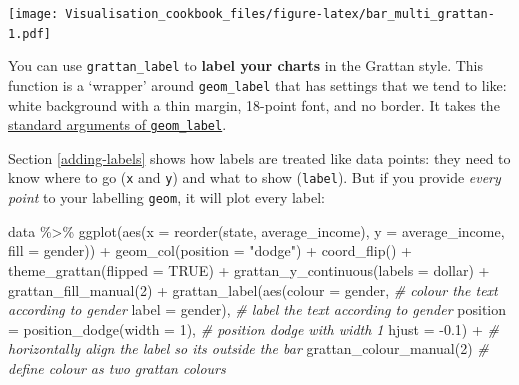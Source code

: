 \documentclass[
]{book}
\newenvironment{Shaded}{\begin{snugshade}}{\end{snugshade}}
\newcommand{\AttributeTok}[1]{\textcolor[rgb]{0.77,0.63,0.00}{#1}}
\newcommand{\CommentTok}[1]{\textcolor[rgb]{0.56,0.35,0.01}{\textit{#1}}}
\newcommand{\ConstantTok}[1]{\textcolor[rgb]{0.00,0.00,0.00}{#1}}
\newcommand{\DecValTok}[1]{\textcolor[rgb]{0.00,0.00,0.81}{#1}}
\newcommand{\FloatTok}[1]{\textcolor[rgb]{0.00,0.00,0.81}{#1}}
\newcommand{\FunctionTok}[1]{\textcolor[rgb]{0.00,0.00,0.00}{#1}}
\newcommand{\NormalTok}[1]{#1}
\newcommand{\SpecialCharTok}[1]{\textcolor[rgb]{0.00,0.00,0.00}{#1}}
\newcommand{\StringTok}[1]{\textcolor[rgb]{0.31,0.60,0.02}{#1}}
\begin{document}
\texttt{[image: Visualisation\_cookbook\_files/figure-latex/bar\_multi\_grattan-1.pdf]}

You can use \texttt{grattan\_label} to \textbf{label your charts} in the Grattan style. This function is a `wrapper' around \texttt{geom\_label} that has settings that we tend to like: white background with a thin margin, 18-point font, and no border. It takes the \href{https://ggplot2.tidyverse.org/reference/geom_text.html}{standard arguments of \texttt{geom\_label}}.

Section \ref{adding-labels} shows how labels are treated like data points: they need to know where to go (\texttt{x} and \texttt{y}) and what to show (\texttt{label}). But if you provide \emph{every point} to your labelling \texttt{geom}, it will plot every label:

\begin{Shaded}
\begin{Highlighting}[]
\NormalTok{data }\SpecialCharTok{\%\textgreater{}\%} 
  \FunctionTok{ggplot}\NormalTok{(}\FunctionTok{aes}\NormalTok{(}\AttributeTok{x =} \FunctionTok{reorder}\NormalTok{(state, average\_income), }
             \AttributeTok{y =}\NormalTok{ average\_income,}
             \AttributeTok{fill =}\NormalTok{ gender)) }\SpecialCharTok{+} 
  \FunctionTok{geom\_col}\NormalTok{(}\AttributeTok{position =} \StringTok{"dodge"}\NormalTok{) }\SpecialCharTok{+} 
  \FunctionTok{coord\_flip}\NormalTok{() }\SpecialCharTok{+} 
  \FunctionTok{theme\_grattan}\NormalTok{(}\AttributeTok{flipped =} \ConstantTok{TRUE}\NormalTok{) }\SpecialCharTok{+} 
  \FunctionTok{grattan\_y\_continuous}\NormalTok{(}\AttributeTok{labels =}\NormalTok{ dollar) }\SpecialCharTok{+} 
  \FunctionTok{grattan\_fill\_manual}\NormalTok{(}\DecValTok{2}\NormalTok{) }\SpecialCharTok{+} 
  \FunctionTok{grattan\_label}\NormalTok{(}\FunctionTok{aes}\NormalTok{(}\AttributeTok{colour =}\NormalTok{ gender,  }\CommentTok{\# colour the text according to gender}
                    \AttributeTok{label =}\NormalTok{ gender),  }\CommentTok{\# label the text according to gender}
            \AttributeTok{position =} \FunctionTok{position\_dodge}\NormalTok{(}\AttributeTok{width =} \DecValTok{1}\NormalTok{),  }\CommentTok{\# position dodge with width 1}
            \AttributeTok{hjust =} \SpecialCharTok{{-}}\FloatTok{0.1}\NormalTok{) }\SpecialCharTok{+}  \CommentTok{\# horizontally align the label so its outside the bar}
  \FunctionTok{grattan\_colour\_manual}\NormalTok{(}\DecValTok{2}\NormalTok{)   }\CommentTok{\# define colour as two grattan colours}
\end{Highlighting}
\end{Shaded}
\end{document}
